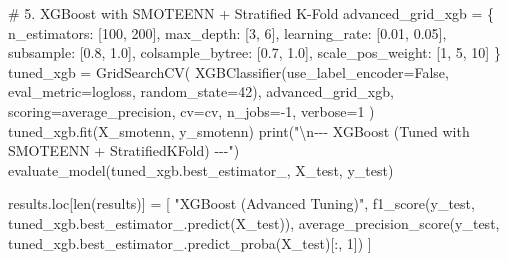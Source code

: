 \documentclass[
  letterpaper,
  DIV=11,
  numbers=noendperiod]{scrartcl}
\newenvironment{Shaded}{\begin{snugshade}}{\end{snugshade}}
\newcommand{\BuiltInTok}[1]{\textcolor[rgb]{0.00,0.23,0.31}{#1}}
\newcommand{\CharTok}[1]{\textcolor[rgb]{0.13,0.47,0.30}{#1}}
\newcommand{\CommentTok}[1]{\textcolor[rgb]{0.37,0.37,0.37}{#1}}
\newcommand{\DecValTok}[1]{\textcolor[rgb]{0.68,0.00,0.00}{#1}}
\newcommand{\FloatTok}[1]{\textcolor[rgb]{0.68,0.00,0.00}{#1}}
\newcommand{\NormalTok}[1]{\textcolor[rgb]{0.00,0.23,0.31}{#1}}
\newcommand{\OperatorTok}[1]{\textcolor[rgb]{0.37,0.37,0.37}{#1}}
\newcommand{\StringTok}[1]{\textcolor[rgb]{0.13,0.47,0.30}{#1}}
\newcommand{\VariableTok}[1]{\textcolor[rgb]{0.07,0.07,0.07}{#1}}
\begin{document}
\begin{Shaded}
\begin{Highlighting}[]
    \CommentTok{\# 5. XGBoost with SMOTEENN + Stratified K{-}Fold}
\NormalTok{    advanced\_grid\_xgb }\OperatorTok{=}\NormalTok{ \{}
        \StringTok{\textquotesingle{}n\_estimators\textquotesingle{}}\NormalTok{: [}\DecValTok{100}\NormalTok{, }\DecValTok{200}\NormalTok{],}
        \StringTok{\textquotesingle{}max\_depth\textquotesingle{}}\NormalTok{: [}\DecValTok{3}\NormalTok{, }\DecValTok{6}\NormalTok{],}
        \StringTok{\textquotesingle{}learning\_rate\textquotesingle{}}\NormalTok{: [}\FloatTok{0.01}\NormalTok{, }\FloatTok{0.05}\NormalTok{],}
        \StringTok{\textquotesingle{}subsample\textquotesingle{}}\NormalTok{: [}\FloatTok{0.8}\NormalTok{, }\FloatTok{1.0}\NormalTok{],}
        \StringTok{\textquotesingle{}colsample\_bytree\textquotesingle{}}\NormalTok{: [}\FloatTok{0.7}\NormalTok{, }\FloatTok{1.0}\NormalTok{],}
        \StringTok{\textquotesingle{}scale\_pos\_weight\textquotesingle{}}\NormalTok{: [}\DecValTok{1}\NormalTok{, }\DecValTok{5}\NormalTok{, }\DecValTok{10}\NormalTok{]}
\NormalTok{    \}}
\NormalTok{    tuned\_xgb }\OperatorTok{=}\NormalTok{ GridSearchCV(}
\NormalTok{        XGBClassifier(use\_label\_encoder}\OperatorTok{=}\VariableTok{False}\NormalTok{, eval\_metric}\OperatorTok{=}\StringTok{\textquotesingle{}logloss\textquotesingle{}}\NormalTok{, random\_state}\OperatorTok{=}\DecValTok{42}\NormalTok{),}
\NormalTok{        advanced\_grid\_xgb, scoring}\OperatorTok{=}\StringTok{\textquotesingle{}average\_precision\textquotesingle{}}\NormalTok{, cv}\OperatorTok{=}\NormalTok{cv, n\_jobs}\OperatorTok{={-}}\DecValTok{1}\NormalTok{, verbose}\OperatorTok{=}\DecValTok{1}
\NormalTok{    )}
\NormalTok{    tuned\_xgb.fit(X\_smotenn, y\_smotenn)}
    \BuiltInTok{print}\NormalTok{(}\StringTok{"}\CharTok{\textbackslash{}n}\StringTok{{-}{-}{-} XGBoost (Tuned with SMOTEENN + StratifiedKFold) {-}{-}{-}"}\NormalTok{)}
\NormalTok{    evaluate\_model(tuned\_xgb.best\_estimator\_, X\_test, y\_test)}

\NormalTok{    results.loc[}\BuiltInTok{len}\NormalTok{(results)] }\OperatorTok{=}\NormalTok{ [}
        \StringTok{"XGBoost (Advanced Tuning)"}\NormalTok{,}
\NormalTok{        f1\_score(y\_test, tuned\_xgb.best\_estimator\_.predict(X\_test)),}
\NormalTok{        average\_precision\_score(y\_test, tuned\_xgb.best\_estimator\_.predict\_proba(X\_test)[:, }\DecValTok{1}\NormalTok{])}
\NormalTok{    ]}


\end{Highlighting}
\end{Shaded}
\end{document}
